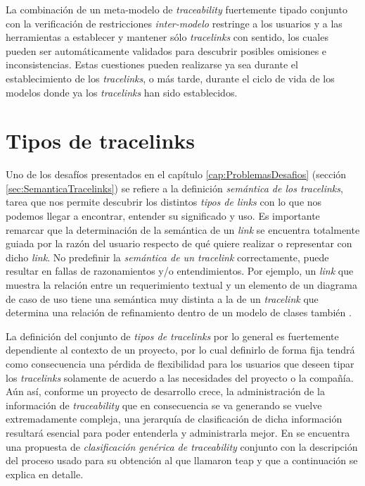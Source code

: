 \documentclass[a4paper,12pt,oneside,spanish]{book}
\begin{document}
La combinación de un meta-modelo de \textit{traceability} fuertemente tipado conjunto con la verificación de restricciones \textit{inter-modelo} restringe a los usuarios y a las herramientas a establecer y mantener sólo \textit{tracelinks} con sentido, los cuales pueden ser automáticamente validados para descubrir posibles omisiones e inconsistencias. Estas cuestiones pueden realizarse ya sea durante el establecimiento de los \textit{tracelinks}, o más tarde, durante el ciclo de vida de los modelos donde ya los \textit{tracelinks} han sido establecidos.




\section{Tipos de tracelinks}

Uno de los desafíos presentados en el capítulo \ref{cap:ProblemasDesafios} (sección \ref{sec:SemanticaTracelinks}) se refiere a la definición  \textit{semántica de los tracelinks}, tarea que nos permite descubrir los distintos \textit{tipos de links} con lo que nos podemos llegar a encontrar, entender su significado y uso. Es importante remarcar que la determinación de la semántica de un \textit{link} se encuentra totalmente guiada por la razón del usuario respecto de qué quiere realizar o representar con dicho \textit{link}. No predefinir la \textit{semántica de un tracelink} correctamente, puede resultar en fallas de razonamientos y/o entendimientos. Por ejemplo, un \textit{link} que muestra la relación entre un requerimiento textual y un elemento de un diagrama de caso de uso  tiene una semántica muy distinta a la de un \textit{tracelink} que determina una relación de refinamiento dentro de un modelo de clases también .

La definición del conjunto de \textit{tipos de tracelinks} por lo general es fuertemente dependiente al contexto de un proyecto, por lo cual definirlo de forma fija tendrá como consecuencia una pérdida de flexibilidad para los usuarios que deseen tipar los \textit{tracelinks} solamente de acuerdo a las necesidades del proyecto o la compañía. Aún así, conforme un proyecto de desarrollo crece, la administración de la información de \textit{traceability} que en consecuencia se va generando se vuelve extremadamente compleja, una jerarquía de clasificación de dicha información resultará esencial para poder entenderla y administrarla mejor. En \cite{PaigeOlsenKolovosZschalerPower} se encuentra una propuesta de \textit{clasificación genérica de traceability} conjunto con la descripción del proceso usado para su obtención al que llamaron \gls{teap} y que a continuación se explica en detalle.
\end{document}
